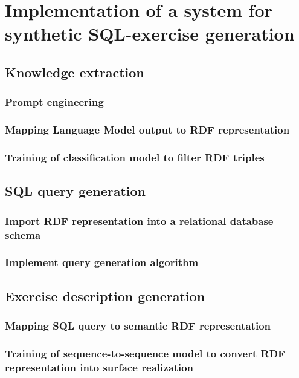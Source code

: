 \chapter{Implementation of a system for synthetic SQL-exercise generation}
\label{ch:imp}



\section{Knowledge extraction}
\label{sec:imp:knowledge}

\subsection{Prompt engineering}
\label{sec:imp:prompt}

\subsection{Mapping Language Model output to RDF representation}
\label{sec:imp:mapping}

\subsection{Training of classification model to filter RDF triples}
\label{sec:imp:filter}



\section{SQL query generation}
\label{sec:imp:generation}

\subsection{Import RDF representation into a relational database schema}
\label{sec:imp:import}

\subsection{Implement query generation algorithm}
\label{sec:imp:algo}



\section{Exercise description generation}
\label{sec:imp:description}

\subsection{Mapping SQL query to semantic RDF representation}
\label{sec:imp:map}

\subsection{Training of sequence-to-sequence model to convert RDF representation into surface realization}
\label{sec:imp:seq}

